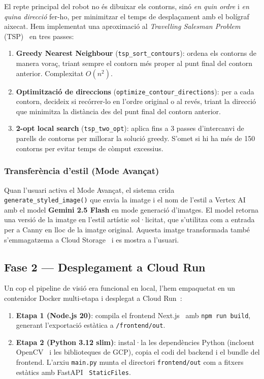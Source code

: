 El repte principal del robot no és dibuixar els contorns, sinó \textit{en quin ordre} i \textit{en quina direcció} fer-ho, per minimitzar el temps de desplaçament amb el bolígraf aixecat. Hem implementat una aproximació al \textit{Travelling Salesman Problem} (TSP)~\cite{tsp} en tres passes:

\begin{enumerate}
  \item \textbf{Greedy Nearest Neighbour} (\texttt{tsp\_sort\_contours}): ordena els contorns de manera voraç, triant sempre el contorn més proper al punt final del contorn anterior. Complexitat $O(n^2)$.

  \item \textbf{Optimització de direccions} (\texttt{optimize\_contour\_directions}): per a cada contorn, decideix si recórrer-lo en l'ordre original o al revés, triant la direcció que minimitza la distància des del punt final del contorn anterior.

  \item \textbf{2-opt local search} (\texttt{tsp\_two\_opt}): aplica fins a 3 passes d'intercanvi de parells de contorns per millorar la solució greedy. S'omet si hi ha més de 150 contorns per evitar temps de còmput excessius.
\end{enumerate}

\subsubsection*{Transferència d'estil (Mode Avançat)}

Quan l'usuari activa el Mode Avançat, el sistema crida \texttt{generate\_styled\_image()} que envia la imatge i el nom de l'estil a Vertex AI~\cite{vertexai} amb el model \textbf{Gemini 2.5 Flash} en mode generació d'imatges. El model retorna una versió de la imatge en l'estil artístic sol·licitat, que s'utilitza com a entrada per a Canny en lloc de la imatge original. Aquesta imatge transformada també s'emmagatzema a Cloud Storage~\cite{gcs} i es mostra a l'usuari.

\subsection{Fase 2 — Desplegament a Cloud Run}

Un cop el pipeline de visió era funcional en local, l'hem empaquetat en un contenidor Docker multi-etapa i desplegat a Cloud Run~\cite{cloudrun}:

\begin{enumerate}
  \item \textbf{Etapa 1 (Node.js 20)}: compila el frontend Next.js~\cite{nextjs} amb \texttt{npm run build}, generant l'exportació estàtica a \texttt{/frontend/out}.
  \item \textbf{Etapa 2 (Python 3.12 slim)}: instal·la les dependències Python (incloent OpenCV~\cite{opencv} i les biblioteques de GCP), copia el codi del backend i el bundle del frontend. L'arxiu \texttt{main.py} munta el directori \texttt{frontend/out} com a fitxers estàtics amb FastAPI~\cite{fastapi} \texttt{StaticFiles}.
\end{enumerate}


